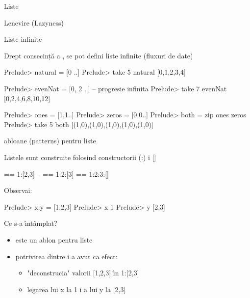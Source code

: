\documentclass[xcolor=pdftex,romanian,colorlinks]{beamer}
\begin{document}
\begin{section}{Liste}
\begin{frame}[fragile]{Lenevire (Lazyness)}
  \end{frame}
  
  \begin{frame}[fragile]{Liste infinite}
  
  
  \begin{block}{}
  
  Drept consecință a , se pot defini liste infinite (fluxuri de date)
  \end{block}
  
  \begin{asciihs}
  Prelude> natural = [0 ..]
  Prelude> take 5 natural
  [0,1,2,3,4]
  \end{asciihs}
  \pause
  \begin{asciihs}
  Prelude> evenNat = [0, 2 ..] -- progresie infinita
  Prelude> take 7 evenNat
  [0,2,4,6,8,10,12]
  \end{asciihs}
  \pause
  \begin{asciihs}
  Prelude> ones = [1,1..]
  Prelude> zeros = [0,0..]
  Prelude> both = zip ones zeros
  Prelude> take 5 both
  [(1,0),(1,0),(1,0),(1,0),(1,0)]
  \end{asciihs}
  
  
  \end{frame}
  
  
\begin{frame}[fragile]{\Sh abloane (patterns) pentru liste}

  Listele sunt construite folosind constructorii (:) \sh i []
  
  \begin{asciihs}
  [1,2,3] == 1:[2,3]  -- == 1:2:[3] == 1:2:3:[]
  \end{asciihs}
  
  Observa\ts i:
  
  \begin{asciihs}
  Prelude> x:y = [1,2,3]
  Prelude> x
  1
  Prelude> y
  [2,3]
  \end{asciihs}
  
  Ce s-a \^{\i}nt\^amplat?
  \begin{itemize}
  
  \item {} este un \sh ablon pentru liste
  \item potrivirea dintre  \sh i \structure{[1,2,3]}
   a avut ca efect:
  \begin{itemize}
  \item "deconstruc\ts ia" valorii [1,2,3]  \^{\i}n 1:[2,3]
  \item  legarea lui x la 1 \sh i a lui y la [2,3]
  \end{itemize}
   \end{itemize}
  \end{frame}
  

\end{section}
\end{document}
